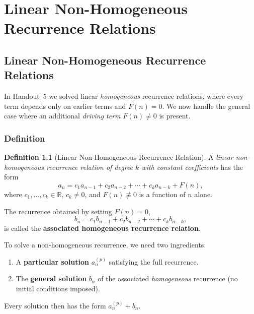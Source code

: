 \documentclass[11pt, a4paper, notitlepage]{report}
\theoremstyle{definition}
\newtheorem{definition}[theorem]{Definition}
\theoremstyle{remark}
\begin{document}
\chapter{Linear Non-Homogeneous Recurrence Relations}
\label{chap:linear-nonhomo}

\section{Linear Non-Homogeneous Recurrence Relations}
\label{sec:lnhrr}

In Handout~5 we solved linear \emph{homogeneous} recurrence relations, where every
term depends only on earlier terms and $F(n)=0$.  We now handle the general case where an
additional \emph{driving term} $F(n)\neq 0$ is present.

\subsection{Definition}
\label{subsec:lnhrr-def}

\begin{definition}[Linear Non-Homogeneous Recurrence Relation]
\label{def:lnhrr}
A \emph{linear non-homogeneous recurrence relation of degree $k$ with constant
coefficients} has the form
\[
  a_n = c_1 a_{n-1} + c_2 a_{n-2} + \cdots + c_k a_{n-k} + F(n),
\]
where $c_1, \ldots, c_k \in \mathbb{R}$, $c_k \neq 0$, and $F(n) \not\equiv 0$ is a
function of $n$ alone.

The recurrence obtained by setting $F(n) = 0$,
\[
  b_n = c_1 b_{n-1} + c_2 b_{n-2} + \cdots + c_k b_{n-k},
\]
is called the \textbf{associated homogeneous recurrence relation}.
\end{definition}

\begin{keyresult}[title={Key Idea: Two Parts}]
To solve a non-homogeneous recurrence, we need two ingredients:
\begin{enumerate}
  \item A \textbf{particular solution} $a_n^{(p)}$ satisfying the full recurrence.
  \item The \textbf{general solution} $b_n$ of the associated \emph{homogeneous} recurrence (no initial conditions imposed).
\end{enumerate}
Every solution then has the form $a_n^{(p)} + b_n$.
\end{keyresult}
\end{document}
